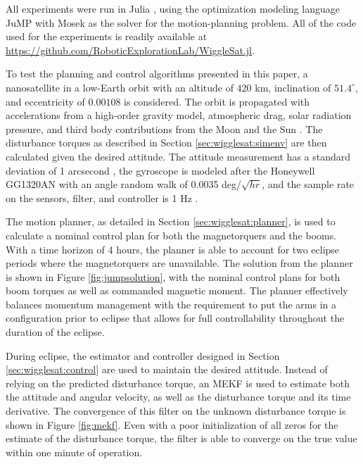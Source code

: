 All experiments were run in Julia \cite{bezanson2017}, using the optimization modeling language JuMP \cite{lubin2015} with Mosek \cite{mosekaps2014} as the solver for the motion-planning problem.  All of the code used for the experiments is readily available at \url{https://github.com/RoboticExplorationLab/WiggleSat.jl}.

To test the planning and control algorithms presented in this paper, a nanosatellite in a low-Earth orbit with an altitude of 420 km, inclination of $51.4^\circ$, and eccentricity of $0.00108$ is considered. The orbit is propagated with accelerations from a high-order gravity model, atmospheric drag, solar radiation pressure, and third body contributions from the Moon and the Sun \cite{montenbruck2002}. The disturbance torques as described in Section \ref{sec:wigglesat:simenv} are then calculated given the desired attitude.  The attitude measurement has a standard deviation of 1 arcsecond \cite{douglas2021}, the gyroscope is modeled after the Honeywell GG1320AN with an angle random walk of 0.0035 deg/$\sqrt{hr}$, and the sample rate on the sensors, filter, and controller is 1 Hz \cite{honeywell}.

The motion planner, as detailed in Section \ref{sec:wigglesat:planner}, is used to calculate a nominal control plan for both the magnetorquers and the booms. With a time horizon of 4 hours, the planner is able to account for two eclipse periods where the magnetorquers are unavailable. The solution from the planner is shown in Figure \ref{fig:jumpsolution}, with the nominal control plans for both boom torques as well as commanded magnetic moment. The planner effectively balances momentum management with the requirement to put the arms in a configuration prior to eclipse that allows for full controllability throughout the duration of the eclipse.

During eclipse, the estimator and controller designed in Section \ref{sec:wigglesat:control} are used to maintain the desired attitude.   Instead of relying on the predicted disturbance torque, an MEKF is used to estimate both the attitude and angular velocity, as well as the disturbance torque and its time derivative. The convergence of this filter on the unknown disturbance torque is shown in Figure \ref{fig:mekf}. Even with a poor initialization of all zeros for the estimate of the disturbance torque, the filter is able to converge on the true value within one minute of operation.

